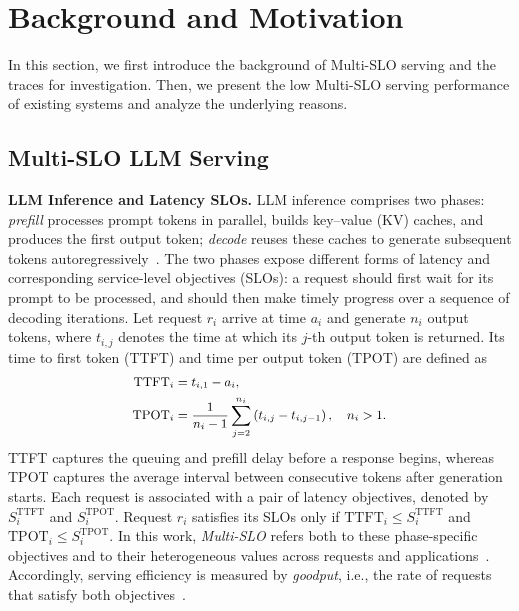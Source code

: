\section{Background and Motivation}
\label{sec:background-and-motivation}

In this section, we first introduce the background of Multi-SLO serving and the traces for investigation. Then, we present the low Multi-SLO serving performance of existing systems and analyze the underlying reasons.

\subsection{Multi-SLO LLM Serving}
\label{sec:multi-slo-llm-serving}

\textbf{LLM Inference and Latency SLOs.}
LLM inference comprises two phases: \emph{prefill} processes prompt tokens in parallel, builds key--value (KV) caches, and produces the first output token; \emph{decode} reuses these caches to generate subsequent tokens autoregressively~\cite{yu2022orca,kwon2023vllm}.
The two phases expose different forms of latency and corresponding service-level objectives (SLOs): a request should first wait for its prompt to be processed, and should then make timely progress over a sequence of decoding iterations.
Let request $r_i$ arrive at time $a_i$ and generate $n_i$ output tokens, where $t_{i,j}$ denotes the time at which its $j$-th output token is returned.
Its time to first token (TTFT) and time per output token (TPOT) are defined as
\begin{equation}
  \small
  \begin{aligned}
    \mathrm{TTFT}_i &= t_{i,1} - a_i, \\
    \mathrm{TPOT}_i &= \frac{1}{n_i-1}
    \sum_{j=2}^{n_i}\left(t_{i,j}-t_{i,j-1}\right),
    \quad n_i > 1.
  \end{aligned}
  \label{eq:latency-metrics}
\end{equation}
TTFT captures the queuing and prefill delay before a response begins, whereas TPOT captures the average interval between consecutive tokens after generation starts.
Each request is associated with a pair of latency objectives, denoted by $S_i^{\mathrm{TTFT}}$ and $S_i^{\mathrm{TPOT}}$.
Request $r_i$ satisfies its SLOs only if
$\mathrm{TTFT}_i \leq S_i^{\mathrm{TTFT}}$ and
$\mathrm{TPOT}_i \leq S_i^{\mathrm{TPOT}}$.
In this work, \emph{Multi-SLO} refers both to these phase-specific objectives and to their heterogeneous values across requests and applications~\cite{li2026adaserve}.
Accordingly, serving efficiency is measured by \textit{goodput}, i.e., the rate of requests that satisfy both objectives~\cite{zhong2024distserve}.


